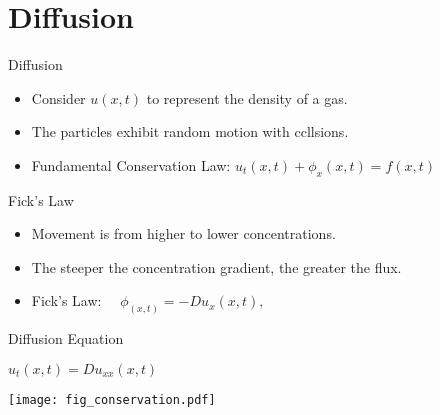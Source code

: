\documentclass[t,10pt,fleqn]{beamer}
\begin{document}
\section{Diffusion}
\begin{frame}{Diffusion}
\pause
\begin{block}{}

\begin{itemize}
   \pause
      \item Consider $u(x,t)$ to represent the density of a gas.  
      \pause
      \item The particles exhibit random motion with ccllsions.
       \pause
\item Fundamental Conservation Law:   $ u_t(x,t) + \phi_x(x,t)= f(x,t)$ 
\end{itemize}

\end{block}


\pause
\begin{block}{Fick's Law}

\begin{itemize}
      \pause
      \item Movement is from higher to lower concentrations. 
             \pause
      \item The steeper the concentration gradient, the greater the flux.
      \pause
\item Fick's Law:  $\quad  \phi_(x,t)= -D u_x(x,t),$
\end{itemize}

\end{block}




\end{frame}
\begin{frame}{Diffusion Equation}
\pause
\begin{block}{}

\begin{center}
     $ u_t(x,t) = Du_{xx}(x,t)$ 
\end{center}

\end{block}


\pause

\begin{center}
\vspace{-3.2cm}
\texttt{[image: fig\_conservation.pdf]}
\end{center}
 \vspace{-2.5cm}
\pause




\end{frame}
\end{document}
